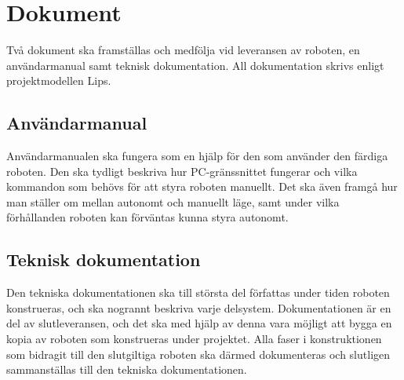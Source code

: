 \section{Dokument}
Två dokument ska framställas och medfölja vid leveransen av roboten, en användarmanual samt teknisk dokumentation. All dokumentation skrivs enligt projektmodellen Lips.

\subsection{Användarmanual}
Användarmanualen ska fungera som en hjälp för den som använder den färdiga roboten. Den ska tydligt beskriva hur PC-gränssnittet fungerar och vilka kommandon som behövs för att styra roboten manuellt. Det ska även framgå hur man ställer om mellan autonomt och manuellt läge, samt under vilka förhållanden roboten kan förväntas kunna styra autonomt.

\subsection{Teknisk dokumentation}
Den tekniska dokumentationen ska till största del författas under tiden roboten konstrueras, och ska nogrannt beskriva varje delsystem. Dokumentationen är en del av slutleveransen, och det ska med hjälp av denna vara möjligt att bygga en kopia av roboten som konstrueras under projektet. Alla faser i konstruktionen som bidragit till den slutgiltiga roboten ska därmed dokumenteras och slutligen sammanställas till den tekniska dokumentationen.